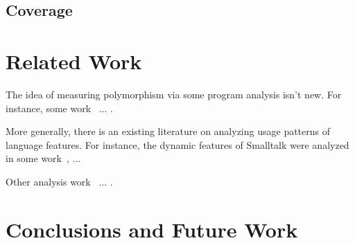 \documentclass[acmsmall,10pt,review,anonymous]{acmart}\settopmatter{printfolios=true,printccs=false,printacmref=false}
\begin{document}
%
%
%
%
\subsection{Coverage}


%
%
%
%
\section{Related Work}


The idea of measuring polymorphism via some program analysis isn't new.
For instance, some work~\cite{aakerblom2015measuring} ... .

More generally, there is an existing literature on analyzing usage patterns
of language features.  For instance, the dynamic features of Smalltalk were
analyzed in some work~\cite{callau2011howdevelopers}, ...

Other analysis work~\cite{milojkovic2017duck} ... .

\section{Conclusions and Future Work}



\end{document}
